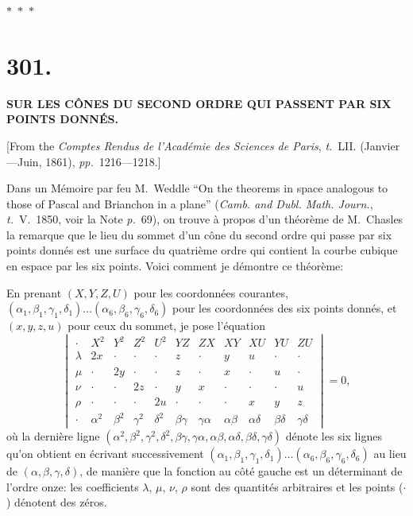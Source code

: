 \documentclass[11pt,a4paper]{article}
\newcommand{\tome}{\textit{t.}}
\newcommand{\page}{\textit{p.}}
\newcommand{\pages}{\textit{pp.}}
\newcommand{\asterism}{\par\begin{center}$\ast$~$\ast$~$\ast$\end{center}\par}
\begin{document}
\asterism

\clearpage

\section*{301.}

\begin{center}
\textbf{SUR LES C\^{O}NES DU SECOND ORDRE QUI PASSENT PAR SIX\\POINTS DONN\'{E}S.}
\end{center}

[From the \textit{Comptes Rendus de l'Acad\'{e}mie des Sciences de Paris}, \tome~LII. (Janvier---Juin, 1861), \pages~1216---1218.]

\medskip

Dans un M\'{e}moire par feu M.~Weddle ``On the theorems in space analogous to those of Pascal and Brianchon in a plane'' (\textit{Camb. and Dubl. Math. Journ.}, \tome~V.\ 1850, voir la Note \page~69), on trouve \`{a} propos d'un th\'{e}or\`{e}me de M.~Chasles la remarque que le lieu du sommet d'un c\^{o}ne du second ordre qui passe par six points donn\'{e}s est une surface du quatri\`{e}me ordre qui contient la courbe cubique en espace par les six points. Voici comment je d\'{e}montre ce th\'{e}or\`{e}me:

En prenant $(X, Y, Z, U)$ pour les coordonn\'{e}es courantes, $(\alpha_1, \beta_1, \gamma_1, \delta_1) \ldots (\alpha_6, \beta_6, \gamma_6, \delta_6)$ pour les coordonn\'{e}es des six points donn\'{e}s, et $(x, y, z, u)$ pour ceux du sommet, je pose l'\'{e}quation
\[
\begin{vmatrix}
\cdot & X^2 & Y^2 & Z^2 & U^2 & YZ & ZX & XY & XU & YU & ZU \\
\lambda & 2x & \cdot & \cdot & \cdot & z & \cdot & y & u & \cdot & \cdot \\
\mu & \cdot & 2y & \cdot & \cdot & z & \cdot & x & \cdot & u & \cdot \\
\nu & \cdot & \cdot & 2z & \cdot & y & x & \cdot & \cdot & \cdot & u \\
\rho & \cdot & \cdot & \cdot & 2u & \cdot & \cdot & \cdot & x & y & z \\
\cdot & \alpha^2 & \beta^2 & \gamma^2 & \delta^2 & \beta\gamma & \gamma\alpha & \alpha\beta & \alpha\delta & \beta\delta & \gamma\delta
\end{vmatrix}
= 0,
\]
o\`{u} la derni\`{e}re ligne $(\alpha^2, \beta^2, \gamma^2, \delta^2, \beta\gamma, \gamma\alpha, \alpha\beta, \alpha\delta, \beta\delta, \gamma\delta)$ d\'{e}note les six lignes qu'on obtient en \'{e}crivant successivement $(\alpha_1, \beta_1, \gamma_1, \delta_1) \ldots (\alpha_6, \beta_6, \gamma_6, \delta_6)$ au lieu de $(\alpha, \beta, \gamma, \delta)$, de mani\`{e}re que la fonction au c\^{o}t\'{e} gauche est un d\'{e}terminant de l'ordre onze: les coefficients $\lambda$, $\mu$, $\nu$, $\rho$ sont des quantit\'{e}s arbitraires et les points ($\cdot$) d\'{e}notent des z\'{e}ros.
\end{document}
